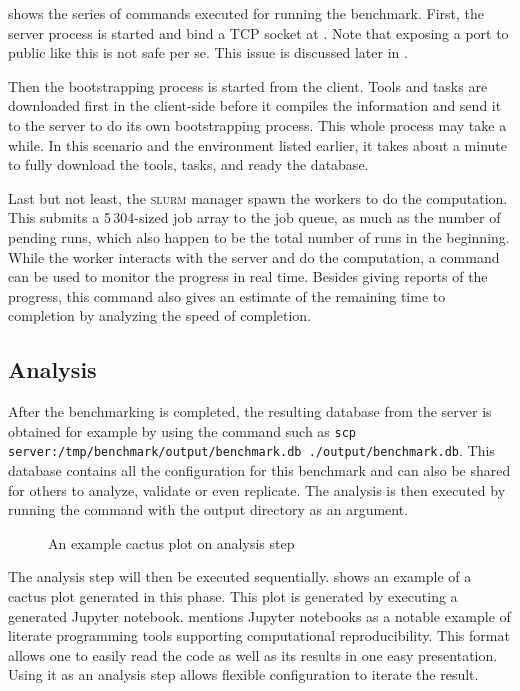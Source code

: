  shows the series of commands executed for running the benchmark.
First, the server process is started and bind a TCP socket at .
Note that exposing a port to public like this is not safe per se.
This issue is discussed later in .

Then the bootstrapping process is started from the client.
Tools and tasks are downloaded first in the client-side before it compiles the information and send it to the server to do its own bootstrapping process.
This whole process may take a while.
In this scenario and the environment listed earlier, it takes about a minute to fully download the tools, tasks, and ready the database.

Last but not least, the \textsc{slurm} manager spawn the workers to do the computation.
This submits a 5\,304-sized job array to the job queue, as much as the number of pending runs, which also happen to be the total number of runs in the beginning.
While the worker interacts with the server and do the computation, a  command can be used to monitor the progress in real time.
Besides giving reports of the progress, this command also gives an estimate of the remaining time to completion by analyzing the speed of completion.

\subsection{Analysis}

After the benchmarking is completed, the resulting database from the server is obtained for example by using the  command such as \texttt{scp server:/tmp/benchmark/output/benchmark.db ./output/benchmark.db}.
This database contains all the configuration for this benchmark and can also be shared for others to analyze, validate or even replicate.
The analysis is then executed by running the  command with the output directory as an argument.

\begin{figure}
	\centering
	\caption{An example cactus plot on analysis step}
	\label{fig:eval.cactus}
\end{figure}

The analysis step will then be executed sequentially.
 shows an example of a cactus plot generated in this phase.
This plot is generated by executing a generated Jupyter notebook.
\citet{piccoloToolsTechniquesComputational2016} mentions Jupyter notebooks as a notable example of literate programming tools supporting computational reproducibility.
This format allows one to easily read the code as well as its results in one easy presentation.
Using it as an analysis step allows flexible configuration to iterate the result.

